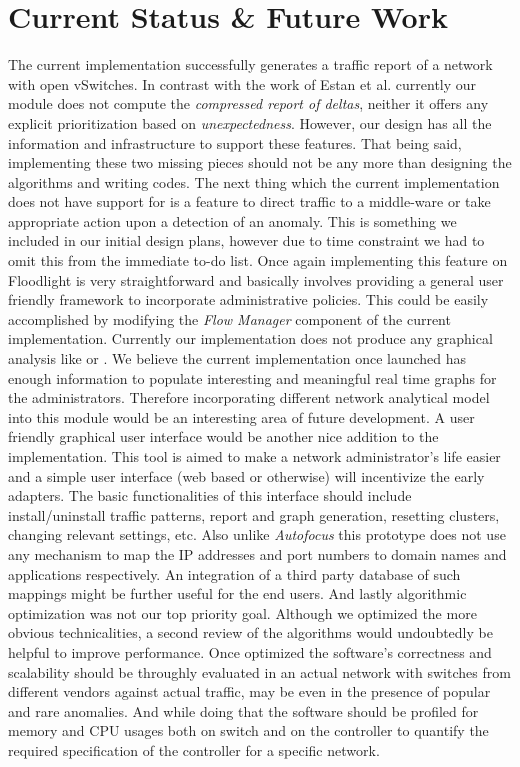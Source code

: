 \documentclass[twocolumn]{article}
\begin{document}
\section{Current Status \& Future Work}
\label{sec:futurework}
The current implementation successfully generates a traffic report of a network with open vSwitches. In contrast with the work of Estan et al. \cite{autofocus} currently our module does not compute the \emph{compressed report of deltas}, neither it offers any explicit prioritization based on \emph{unexpectedness}. However, our design has all the information and infrastructure to support these features. That being said, implementing these two missing pieces should not be any more than designing the algorithms and writing codes. The next thing which the current implementation does not have support for is a feature to direct traffic to a middle-ware or take appropriate action upon a detection of an anomaly. This is something we included in our initial design plans, however due to time constraint we had to omit this from the immediate to-do list. Once again implementing this feature on Floodlight is very straightforward and basically involves providing a general user friendly framework to incorporate administrative policies. This could be easily accomplished by modifying the \emph{Flow Manager} component of the current implementation. Currently our implementation does not produce any graphical analysis like \cite{estan} or \cite{flowscan}. We believe the current implementation once launched has enough information to populate interesting and meaningful real time graphs for the administrators. Therefore incorporating different network analytical model into this module would be an interesting area of future development. A user friendly graphical user interface would be another nice addition to the implementation. This tool is aimed to make a network administrator\rq{}s life easier and a simple user interface (web based or otherwise) will incentivize the early adapters. The basic functionalities of this interface should include install/uninstall traffic patterns, report and graph generation, resetting clusters, changing relevant settings, etc.  Also unlike \emph{Autofocus} this prototype does not use any mechanism to map the IP addresses and port numbers to domain names and applications respectively. An integration of a third party database of such mappings might be further useful for the end users. And lastly algorithmic optimization was not our top priority goal. Although we optimized the more obvious technicalities, a second review of the algorithms would undoubtedly be helpful to improve performance. Once optimized the software\rq{}s correctness and scalability should be throughly evaluated in an actual network with switches from different vendors against actual traffic, may be even in the presence of popular and rare anomalies. And while doing that the software should be profiled for memory and CPU usages both on switch and on the controller to quantify the required specification of the controller for a specific network.
\end{document}
